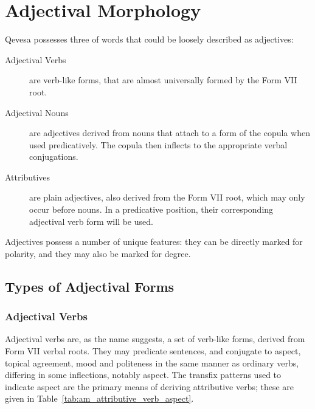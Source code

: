 \documentclass[grammar]{subfiles}
\begin{document}
  \chapter{Adjectival Morphology}
  \label{ch:adjectival-morphology}

  Qevesa possesses three of words that could be loosely described as adjectives:

  \begin{description}
    \item[Adjectival Verbs] are verb-like forms, that are almost universally formed by the Form VII root.
    \item[Adjectival Nouns] are adjectives derived from nouns that attach to a form of the copula when used predicatively. The copula then inflects to the appropriate verbal conjugations.
    \item[Attributives] are plain adjectives, also derived from the Form VII root, which may only occur before nouns. In a predicative position, their corresponding adjectival verb form will be used.
  \end{description}

  Adjectives possess a number of unique features: they can be directly marked for polarity, and they may also be marked for degree.

  \section{Types of Adjectival Forms}
  \label{sec:am_adjectival_forms}

  \subsection{Adjectival Verbs}
  \label{ssec:am_adjectival_verbs}

  Adjectival verbs are, as the name suggests, a set of verb-like forms, derived from Form VII verbal roots. They may predicate sentences, and conjugate to aspect, topical agreement, mood and politeness in the same manner as ordinary verbs, differing in some inflections, notably aspect. The transfix patterns used to indicate aspect are the primary means of deriving attributive verbs; these are given in Table~\ref{tab:am_attributive_verb_aspect}.
\end{document}

